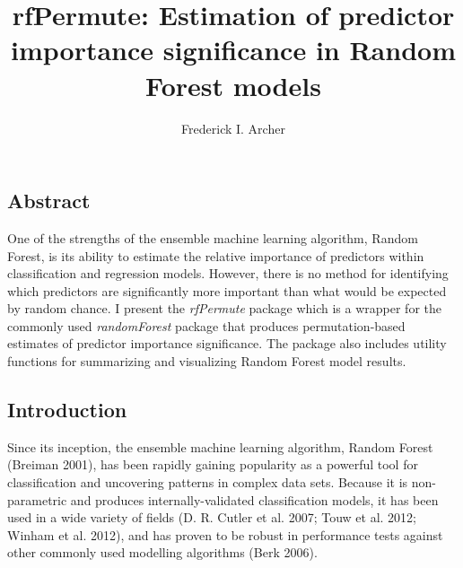 \documentclass[]{article}
\title{rfPermute: Estimation of predictor importance significance in Random
Forest models}
\author{Frederick I. Archer}
\date{}
\begin{document}
\maketitle

\subsection{Abstract}\label{abstract}

One of the strengths of the ensemble machine learning algorithm, Random
Forest, is its ability to estimate the relative importance of predictors
within classification and regression models. However, there is no method
for identifying which predictors are significantly more important than
what would be expected by random chance. I present the \emph{rfPermute}
package which is a wrapper for the commonly used \emph{randomForest}
package that produces permutation-based estimates of predictor
importance significance. The package also includes utility functions for
summarizing and visualizing Random Forest model results.

\subsection{Introduction}\label{introduction}

Since its inception, the ensemble machine learning algorithm, Random
Forest (Breiman 2001), has been rapidly gaining popularity as a powerful
tool for classification and uncovering patterns in complex data sets.
Because it is non-parametric and produces internally-validated
classification models, it has been used in a wide variety of fields (D.
R. Cutler et al. 2007; Touw et al. 2012; Winham et al. 2012), and has
proven to be robust in performance tests against other commonly used
modelling algorithms (Berk 2006).
\end{document}
